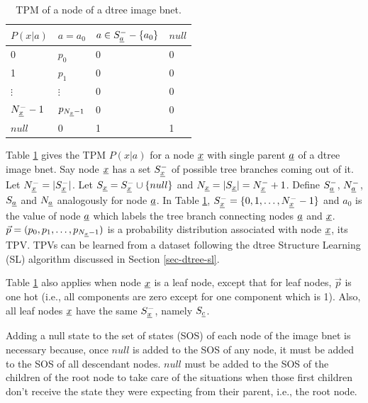 \begin{table}[]
\centering
\begin{tabular}{|l|l|l|l|}
\hline
$P(x|a)$ & \cellcolor[HTML]{ECF4FF}$a=a_0$ & \cellcolor[HTML]{ECF4FF}$a\in S^-_{\underline{a}}-\{a_0\}$ & \cellcolor[HTML]{ECF4FF}$null$ \\ \hline
\cellcolor[HTML]{ECF4FF}0 & $p_0$ & 0 & 0 \\ \hline
\cellcolor[HTML]{ECF4FF}1 & $p_1$ & 0 & 0 \\ \hline
\cellcolor[HTML]{ECF4FF}$\vdots$ & $\vdots$ & 0 & 0 \\ \hline
\cellcolor[HTML]{ECF4FF}$N^-_{\underline{x}}-1$ & $p_{N_{\underline{x}}-1}$ & 0 & 0 \\ \hline
\cellcolor[HTML]{ECF4FF}$null$ & 0 & 1 & 1 \\ \hline
\end{tabular}
\caption{TPM of a node of a dtree image bnet.}
\label{tab-dtree-tpm}
\end{table}


Table \ref{tab-dtree-tpm}
gives the 
TPM $P(x|a)$
for a node ${\underline{x}}$
with single parent ${\underline{a}}$
of a dtree image bnet. 
Say node ${\underline{x}}$ has 
a set $S^-_{\underline{x}}$
of possible tree branches
coming out of it. 
Let $N^-_{\underline{x}} = |S^-_{\underline{x}}|$.
Let $S_{\underline{x}}=S^-_{\underline{x}}\cup \{null\}$
and $N_{\underline{x}}=|S_{\underline{x}}|=N^-_{\underline{x}}+1$.
Define $S^-_{\underline{a}}$, $N^-_{\underline{a}}$,
$S_{\underline{a}}$
and $N_{\underline{a}}$
analogously for node ${\underline{a}}$.
In Table \ref{tab-dtree-tpm},
$S^-_{\underline{x}}=\{0,1, \ldots, N^-_{\underline{x}}-1\}$
and 
$a_0$ is the value
of node ${\underline{a}}$ which 
labels the tree branch
connecting nodes ${\underline{a}}$ and ${\underline{x}}$.
$\vec{p}=(p_0, p_1, \ldots, p_{N_{\underline{x}}-1})$
is a probability
distribution 
associated with node ${\underline{x}}$,
its TPV.
TPVs
can be learned from
a dataset
following
the dtree Structure Learning (SL)
algorithm
discussed in Section \ref{sec-dtree-sl}.

Table \ref{tab-dtree-tpm}
also applies when node ${\underline{x}}$
is a leaf node,
except that for leaf nodes,
$\vec{p}$ is one hot (i.e., 
all components are zero 
except for one 
component which is 1).
Also, all 
leaf nodes
${\underline{x}}$ have the same $S^-_{\underline{x}}$,
namely $S_{\underline{c}}$.


Adding a null state
to the set of states (SOS) of each node 
of the image bnet
is necessary
because, once $null$
is added 
to the SOS of any node,
it must be added to the SOS
 of all descendant
nodes.
$null$ must be added to the 
SOS of the children of
the root node
to
take care of the situations
when those first children
don't receive the state 
they were expecting from their
parent, i.e., the root node.


